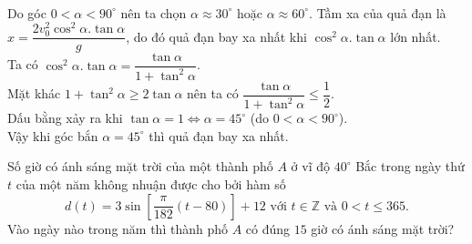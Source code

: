 \begin{ex}
{\begin{itemchoice}
\begin{eqnarray*}
			\end{eqnarray*} Do góc $0<\alpha<90^\circ$ nên ta chọn $\alpha\approx 30^\circ$ hoặc $\alpha\approx 60^\circ$.
			\itemch Tầm  xa của quả đạn  là $x=\dfrac{2 v_0^2 \cos ^2 \alpha.\tan \alpha}{g}$, do đó quả đạn bay xa nhất khi $ \cos ^2 \alpha.\tan \alpha$ lớn nhất.\\
			Ta có $\cos ^2 \alpha.\tan \alpha =\dfrac{\tan \alpha}{1+\tan^2\alpha}$.\\ Mặt khác $1+\tan^2\alpha \ge 2\tan\alpha$  nên ta có $\dfrac{\tan \alpha}{1+\tan^2\alpha} \le \dfrac{1}{2}$.\\  Dấu bằng xảy ra khi $\tan\alpha =1 \Leftrightarrow \alpha=45^\circ $ (do $0<\alpha<90^\circ$). \\
			Vậy khi góc bắn $\alpha=45^\circ$ thì quả đạn bay xa nhất.
		\end{itemchoice}
	}
\end{ex}

\begin{ex}%
	Số giờ có ánh sáng mặt trời của một thành phố $A$ ở vĩ độ $40^\circ$ Bắc trong ngày thứ $t$ của một năm không nhuận được cho bởi hàm số
	\[
	d(t)=3\sin \left[\dfrac{\pi}{182}(t-80)\right] +12 \text{ với } t\in \mathbb{Z} \text{ và } 0<t\leq 365.
	\]
	Vào ngày nào trong năm thì thành phố $A$ có đúng $15$ giờ có ánh sáng mặt trời?
\end{ex}

